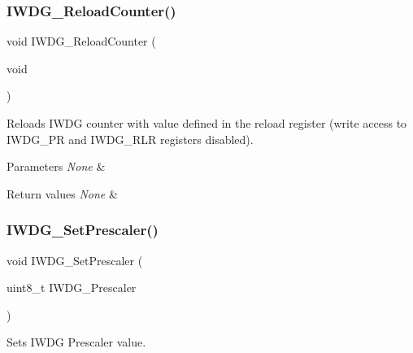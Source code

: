 \subsubsection{\texorpdfstring{IWDG\_ReloadCounter()}{IWDG\_ReloadCounter()}}
{\footnotesize\ttfamily void I\+W\+D\+G\+\_\+\+Reload\+Counter (\begin{DoxyParamCaption}\item[{void}]{ }\end{DoxyParamCaption})}



Reloads I\+W\+DG counter with value defined in the reload register (write access to I\+W\+D\+G\+\_\+\+PR and I\+W\+D\+G\+\_\+\+R\+LR registers disabled). 


\begin{DoxyParams}{Parameters}
{\em None} & \\
\hline
\end{DoxyParams}

\begin{DoxyRetVals}{Return values}
{\em None} & \\
\hline
\end{DoxyRetVals}
\mbox{\label{group___i_w_d_g___exported___functions_ga4fa7f1cd690533a35ad9e4729c0450a3}} 
\subsubsection{\texorpdfstring{IWDG\_SetPrescaler()}{IWDG\_SetPrescaler()}}
{\footnotesize\ttfamily void I\+W\+D\+G\+\_\+\+Set\+Prescaler (\begin{DoxyParamCaption}\item[{uint8\+\_\+t}]{I\+W\+D\+G\+\_\+\+Prescaler }\end{DoxyParamCaption})}



Sets I\+W\+DG Prescaler value. 


